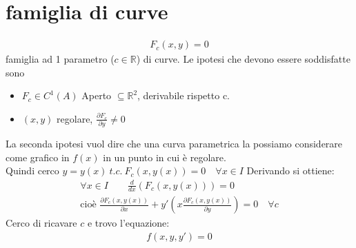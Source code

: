 \documentclass[a4paper, oneside]{article}
\begin{document}
\section{famiglia di curve}
\begin{definition}
    \begin{gather*}
        F_c(x,y) = 0
    \end{gather*}
    famiglia ad 1 parametro ($c \in \mathbb{R}$) di curve.
    Le ipotesi che devono essere soddisfatte sono
    \begin{itemize}
        \item $F_c \in C^1(A)$ Aperto $\subseteq \mathbb{R}^2$, derivabile rispetto c.\\
        \item $(x,y)$ regolare, $\frac{\partial F_c}{\partial y} \neq 0$
    \end{itemize}
    La seconda ipotesi vuol dire che una curva parametrica la possiamo considerare come grafico in $f(x)$ in un punto in cui è regolare.\\
    Quindi cerco $y = y(x) \ t.c. \ \boxed{F_c(x,y(x)) = 0} \quad \forall x \in I$
    Derivando si ottiene:
    \begin{gather*}
        \forall x \in I \qquad \frac{d}{dx}(F_c (x,y(x))) = 0\\
        \text{cioè } \boxed{\frac{\partial F_c(x,y(x))}{\partial x} + y'(x \frac{\partial F_c(x,y(x))}{\partial y}) = 0} \quad \forall c
    \end{gather*}
    Cerco di ricavare $c$ e trovo l'equazione:
    \begin{gather*}
        f(x,y,y') = 0
    \end{gather*}
\end{definition}
\end{document}
